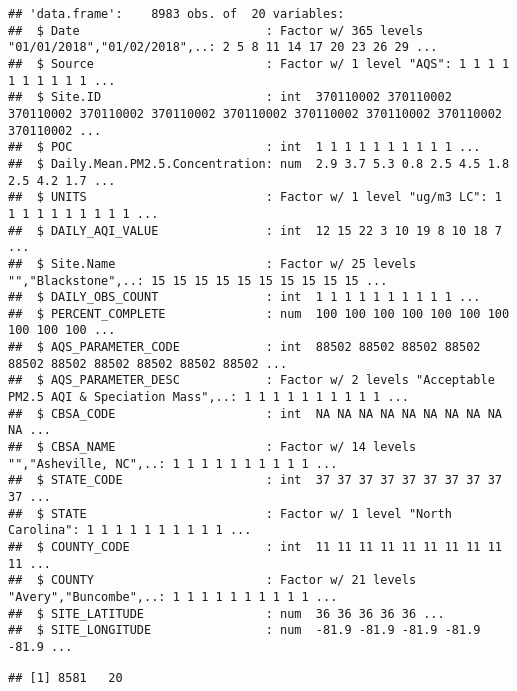 \documentclass[]{article}
\newenvironment{Shaded}{\begin{snugshade}}{\end{snugshade}}
\newcommand{\KeywordTok}[1]{\textcolor[rgb]{0.13,0.29,0.53}{\textbf{#1}}}
\newcommand{\CommentTok}[1]{\textcolor[rgb]{0.56,0.35,0.01}{\textit{#1}}}
\newcommand{\NormalTok}[1]{#1}
\begin{document}
\begin{verbatim}
## 'data.frame':    8983 obs. of  20 variables:
##  $ Date                          : Factor w/ 365 levels "01/01/2018","01/02/2018",..: 2 5 8 11 14 17 20 23 26 29 ...
##  $ Source                        : Factor w/ 1 level "AQS": 1 1 1 1 1 1 1 1 1 1 ...
##  $ Site.ID                       : int  370110002 370110002 370110002 370110002 370110002 370110002 370110002 370110002 370110002 370110002 ...
##  $ POC                           : int  1 1 1 1 1 1 1 1 1 1 ...
##  $ Daily.Mean.PM2.5.Concentration: num  2.9 3.7 5.3 0.8 2.5 4.5 1.8 2.5 4.2 1.7 ...
##  $ UNITS                         : Factor w/ 1 level "ug/m3 LC": 1 1 1 1 1 1 1 1 1 1 ...
##  $ DAILY_AQI_VALUE               : int  12 15 22 3 10 19 8 10 18 7 ...
##  $ Site.Name                     : Factor w/ 25 levels "","Blackstone",..: 15 15 15 15 15 15 15 15 15 15 ...
##  $ DAILY_OBS_COUNT               : int  1 1 1 1 1 1 1 1 1 1 ...
##  $ PERCENT_COMPLETE              : num  100 100 100 100 100 100 100 100 100 100 ...
##  $ AQS_PARAMETER_CODE            : int  88502 88502 88502 88502 88502 88502 88502 88502 88502 88502 ...
##  $ AQS_PARAMETER_DESC            : Factor w/ 2 levels "Acceptable PM2.5 AQI & Speciation Mass",..: 1 1 1 1 1 1 1 1 1 1 ...
##  $ CBSA_CODE                     : int  NA NA NA NA NA NA NA NA NA NA ...
##  $ CBSA_NAME                     : Factor w/ 14 levels "","Asheville, NC",..: 1 1 1 1 1 1 1 1 1 1 ...
##  $ STATE_CODE                    : int  37 37 37 37 37 37 37 37 37 37 ...
##  $ STATE                         : Factor w/ 1 level "North Carolina": 1 1 1 1 1 1 1 1 1 1 ...
##  $ COUNTY_CODE                   : int  11 11 11 11 11 11 11 11 11 11 ...
##  $ COUNTY                        : Factor w/ 21 levels "Avery","Buncombe",..: 1 1 1 1 1 1 1 1 1 1 ...
##  $ SITE_LATITUDE                 : num  36 36 36 36 36 ...
##  $ SITE_LONGITUDE                : num  -81.9 -81.9 -81.9 -81.9 -81.9 ...
\end{verbatim}

\begin{Shaded}
\end{Shaded}

\begin{verbatim}
## [1] 8581   20
\end{verbatim}
\end{document}
